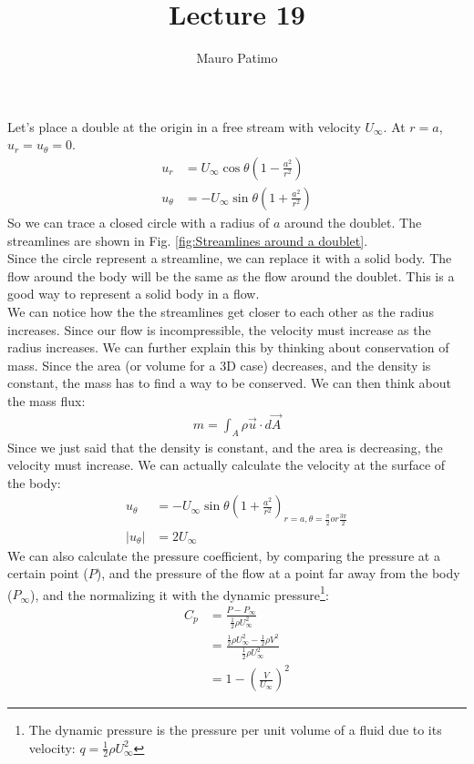 \documentclass{article}
\title{Lecture 19}
\author{Mauro Patimo}
\begin{document}
\maketitle
Let's place a double at the origin in a free stream with velocity $U_\infty$. At $r=a$, $u_r=u_{\theta}=0$.\\
\begin{align*}
    u_r&=U_\infty\cos\theta\left(1-\frac{a^2}{r^2}\right)\\
    u_\theta&=-U_\infty\sin\theta\left(1+\frac{a^2}{r^2}\right)
\end{align*}
So we can trace a closed circle with a radius of $a$ around the doublet. The streamlines are shown in Fig. \ref{fig:Streamlines around a doublet}. \\
Since the circle represent a streamline, we can replace it with a solid body. The flow around the body will be the same as the flow around the doublet. This is a good way to represent a solid body in a flow.\\
We can notice how the the streamlines get closer to each other as the radius increases. Since our flow is incompressible, the velocity must increase as the radius increases. 
We can further explain this by thinking about conservation of mass. Since the area (or volume for a 3D case) decreases, and the density is constant, the mass has to find a way to be conserved. We can then think about the mass flux:
\begin{align*}
    m = \int_A \rho \vec{u}\cdot d\vec{A}
\end{align*}
Since we just said that the density is constant, and the area is decreasing, the velocity must increase. We can actually calculate the velocity at the surface of the body:
\begin{align*}
    u_\theta&=-U_\infty\sin\theta\left(1+\frac{a^2}{r^2}\right)_{r=a, \theta=\frac{\pi}{2} or \frac{3\pi}{2}}\\
    |u_\theta|&=2U_\infty
\end{align*}
We can also calculate the pressure coefficient, by comparing the pressure at a certain point ($P$), and the pressure of the flow at a point far away from the body ($P_\infty$), and the normalizing it with the dynamic pressure\footnote{The dynamic pressure is the pressure per unit volume of a fluid due to its velocity: $q=\frac{1}{2}\rho U_{\infty}^2$}:
\begin{align*}
    C_p&=\frac{P-P_\infty}{\frac{1}{2}\rho U_\infty^2}\\
    &=\frac{\frac{1}{2}\rho U_{\infty}^2 - \frac{1}{2}\rho V^2}{\frac{1}{2}\rho U_\infty^2}\\
    &=1-\left(\frac{V}{U_\infty}\right)^2
\end{align*}
\end{document}
